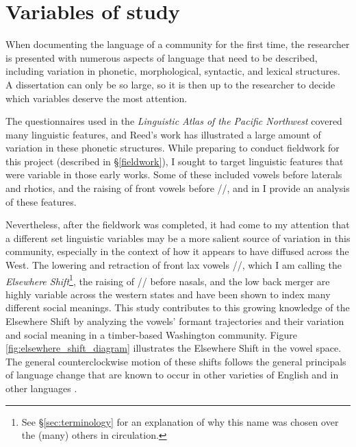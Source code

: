 \section{Variables of study}

When documenting the language of a community for the first time, the researcher is presented with numerous aspects of language that need to be described, including variation in phonetic, morphological, syntactic, and lexical structures. A dissertation can only be so large, so it is then up to the researcher to decide which variables deserve the most attention.

The questionnaires used in the \textit{Linguistic Atlas of the Pacific Northwest} covered many linguistic features, and Reed's work has illustrated a large amount of variation in these phonetic structures. While preparing to conduct fieldwork for this project (described in \S\ref{fieldwork}), I sought to target linguistic features that were variable in those early works. Some of these included vowels before laterals and rhotics, and the raising of front vowels before //, and in \citet{stanley_2017_ADS, stanley_2018_pwpl} I provide an analysis of these features.

Nevertheless, after the fieldwork was completed, it had come to my attention that a different set linguistic variables may be a more salient source of variation in this community, especially in the context of how it appears to have diffused across the West. The lowering and retraction of front lax vowels //, which I am calling the \textit{Elsewhere Shift}\footnote{See \S\ref{sec:terminology} for an explanation of why this name was chosen over the (many) others in circulation.}, the raising of /\textipa{\ae}/ before nasals, and the low back merger are highly variable across the western states and have been shown to index many different social meanings. This study contributes to this growing knowledge of the Elsewhere Shift by analyzing the vowels' formant trajectories and their variation and social meaning in a timber-based Washington community. Figure \ref{fig:elsewhere_shift_diagram} illustrates the Elsewhere Shift in the vowel space. The general counterclockwise motion of these shifts follows the general principals of language change that are known to occur in other varieties of English and in other languages \citep{labov_1994, harrington_etal_2011}.


